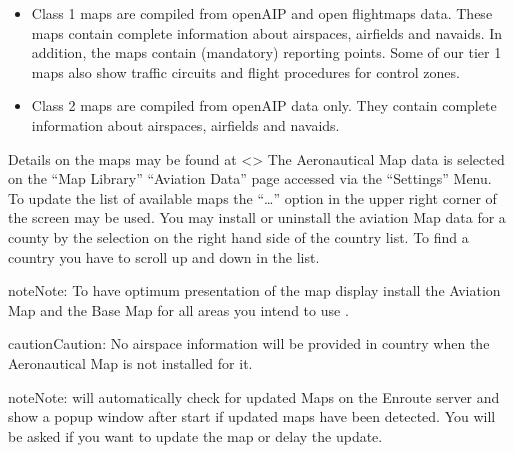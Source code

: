 \documentclass[letterpaper,10pt,english]{sphinxmanual}
\begin{document}
\sphinxAtStartPar
{}
\begin{itemize}
\item {} 
\sphinxAtStartPar
Class 1 maps are compiled from openAIP and open flightmaps data. These maps
contain complete information about airspaces, airfields and navaids. In
addition, the maps contain (mandatory) reporting points. Some of our tier 1
maps also show traffic circuits and flight procedures for control zones.

\item {} 
\sphinxAtStartPar
Class 2 maps are compiled from openAIP data only. They contain complete
information about airspaces, airfields and navaids.

\end{itemize}

\sphinxAtStartPar
Details on the maps may be found at
\textless{}\textgreater{} The Aeronautical Map data is
selected on the “Map Library” \textendash{} “Aviation Data” page accessed via the “Settings”
Menu.  To update the list of available maps the “…” option in the upper right
corner of the screen may be used.  You may install or uninstall the aviation Map
data for a county by the selection on the right hand side of the country
list. To find a country you have to scroll up and down in the list.

\begin{sphinxadmonition}{note}{Note:}
\sphinxAtStartPar
To have optimum presentation of the  map
display install the Aviation Map and the Base Map for all areas you intend
to use .
\end{sphinxadmonition}

\begin{sphinxadmonition}{caution}{Caution:}
\sphinxAtStartPar
No airspace information will be provided in country when the
Aeronautical Map is not installed for it.
\end{sphinxadmonition}

\begin{sphinxadmonition}{note}{Note:}
\sphinxAtStartPar
{} will automatically check for updated
Maps on the Enroute server and show a pop\sphinxhyphen{}up window after start if updated
maps have been detected.  You will be asked if you want to update the map or
delay the update.
\end{sphinxadmonition}
\end{document}
